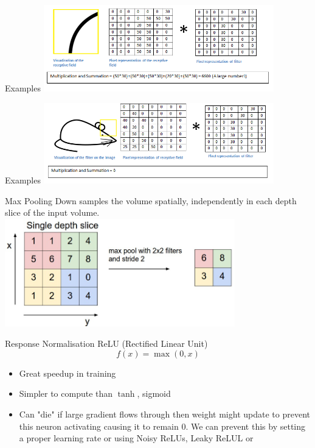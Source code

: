 \documentclass{beamer}
\begin{document}
\begin{frame}{Examples}
	\includegraphics[width=10cm, keepaspectratio]{mousemult}
\end{frame}

\begin{frame}{Examples}
	\includegraphics[width=10cm, keepaspectratio]{mousemult2}
\end{frame}


\begin{frame}{Max Pooling}
Down samples the volume spatially, independently in each depth slice of the input volume. 
\includegraphics[width=10cm]{maxpool}
\end{frame}

\begin{frame}{Response Normalisation}
	ReLU (Rectified Linear Unit)
	$$f(x) = \max(0,x) $$
	\begin{itemize}
		\item Great speedup in training
		\item Simpler to compute than $\tanh$, sigmoid
		\item Can "die" if large gradient flows through then weight might update to prevent this neuron activating causing it to remain 0. We can prevent this by setting a proper learning rate or using Noisy ReLUs, Leaky ReLUL or 
	\end{itemize}

\end{frame}
\end{document}
